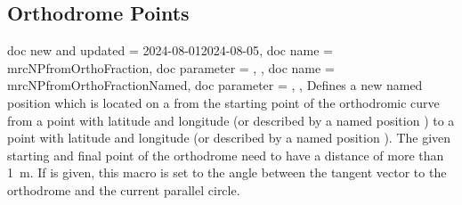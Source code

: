 \clearpage
\subsection{Orthodrome Points}

\begin{docCommands}[
  ]{
    {
      doc new and updated = {2024-08-01}{2024-08-05},
      doc name        = mrcNPfromOrthoFraction,
      doc parameter   = ,
    },
    {
      doc name        = mrcNPfromOrthoFractionNamed,
      doc parameter   = ,
    },
  }
  Defines a new named position  which is located on a 
  from the starting point of the orthodromic curve
  from a point with
  latitude  and longitude  (or described by a named position )
  to a point with
  latitude  and longitude  (or described by a named position ).
  The given starting and final point of the orthodrome need to have a distance of more than
  \SI{1}{\meter}.
  If  is given, this macro is set to the
  angle between the tangent vector to the orthodrome and
  the current parallel circle.

%
\begin{dispExample}
\end{dispExample}
\end{docCommands}

